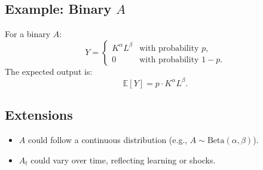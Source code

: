 \documentclass{article}
\begin{document}
\subsection*{Example: Binary \( A \)}
For a binary \( A \):
\[
Y = \begin{cases}
K^\alpha L^\beta & \text{with probability } p, \\
0 & \text{with probability } 1-p.
\end{cases}
\]
The expected output is:
\[
\mathbb{E}[Y] = p \cdot K^\alpha L^\beta.
\]

\subsection*{Extensions}
\begin{itemize}
    \item \( A \) could follow a continuous distribution (e.g., \( A \sim \text{Beta}(\alpha, \beta) \)).
    \item \( A_t \) could vary over time, reflecting learning or shocks.
\end{itemize}
\end{document}
